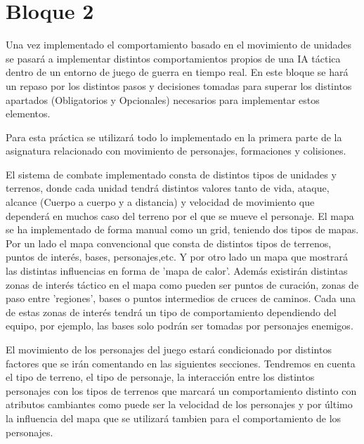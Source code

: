 \part{Bloque 2}

 Una vez implementado el comportamiento basado  en el movimiento de unidades se pasará a implementar distintos comportamientos propios de una IA táctica dentro de un entorno de juego de guerra en tiempo real.  En este bloque se hará un repaso por los distintos pasos y decisiones tomadas para superar los distintos apartados (Obligatorios y Opcionales) necesarios para implementar estos elementos.

Para esta práctica se utilizará todo lo implementado en la primera parte de la asignatura relacionado con movimiento de personajes, formaciones y colisiones.

El sistema de combate implementado consta de distintos tipos de unidades y terrenos, donde cada unidad tendrá distintos valores tanto de vida, ataque, alcance (Cuerpo a cuerpo y a distancia) y velocidad de movimiento que dependerá en muchos caso del terreno por el que se mueve el personaje. El mapa se ha implementado de forma manual como un grid, teniendo dos tipos de mapas. Por un lado el mapa convencional que consta de distintos tipos de terrenos, puntos de interés, bases, personajes,etc. Y por otro lado un mapa que mostrará las distintas influencias en forma de 'mapa de calor'.
Además  existirán distintas zonas de interés táctico en el mapa como pueden ser puntos de curación, zonas de paso entre 'regiones', bases o puntos intermedios de cruces de caminos. Cada una de estas zonas de interés tendrá un tipo de comportamiento dependiendo del equipo, por ejemplo, las bases solo podrán ser tomadas por personajes enemigos.

El movimiento de los personajes del juego estará condicionado por distintos factores que se irán comentando en las siguientes secciones.
Tendremos en cuenta el tipo de terreno, el tipo de personaje, la interacción entre los distintos personajes con los tipos de terrenos que marcará un comportamiento distinto con atributos cambiantes como puede ser la velocidad de los personajes y por último la influencia del mapa que se utilizará tambien para el comportamiento de los personajes.

